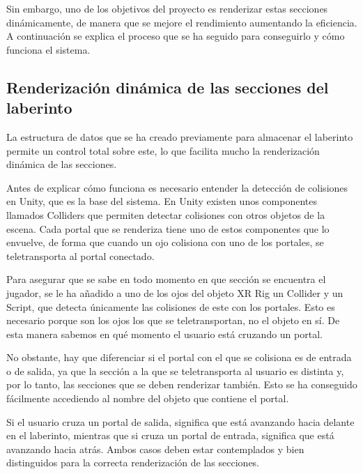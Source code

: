 \documentclass[../main.tex]{subfiles}
\begin{document}
Sin embargo, uno de los objetivos del proyecto es renderizar estas secciones dinámicamente, de manera que se mejore el rendimiento aumentando la eficiencia. A continuación se explica el proceso que se ha seguido para conseguirlo y cómo funciona el sistema.

\subsection{Renderización dinámica de las secciones del laberinto}

La estructura de datos que se ha creado previamente para almacenar el laberinto permite un control total sobre este, lo que facilita mucho la renderización dinámica de las secciones.

Antes de explicar cómo funciona es necesario entender la detección de colisiones en Unity, que es la base del sistema. En Unity existen unos componentes llamados Colliders que permiten detectar colisiones con otros objetos de la escena. Cada portal que se renderiza tiene uno de estos componentes que lo envuelve, de forma que cuando un ojo colisiona con uno de los portales, se teletransporta al portal conectado.

Para asegurar que se sabe en todo momento en que sección se encuentra el jugador, se le ha añadido a uno de los ojos del objeto XR Rig un Collider y un Script, que detecta únicamente las colisiones de este con los portales. Esto es necesario porque son los ojos los que se teletransportan, no el objeto en sí. De esta manera sabemos en qué momento el usuario está cruzando un portal.

No obstante, hay que diferenciar si el portal con el que se colisiona es de entrada o de salida, ya que la sección a la que se teletransporta al usuario es distinta y, por lo tanto, las secciones que se deben renderizar también. Esto se ha conseguido fácilmente accediendo al nombre del objeto que contiene el portal.

Si el usuario cruza un portal de salida, significa que está avanzando hacia delante en el laberinto, mientras que si cruza un portal de entrada, significa que está avanzando hacia atrás. Ambos casos deben estar contemplados y bien distinguidos para la correcta renderización de las secciones.
\end{document}
